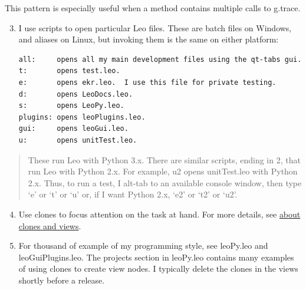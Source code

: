 \documentclass[a4paper,10pt,english]{sphinxmanual}
\begin{document}
This pattern is especially useful when a method contains multiple calls to
g.trace.
\begin{enumerate}
\setcounter{enumi}{2}
\item {} 
I use scripts to open particular Leo files. These are batch files on Windows,
and aliases on Linux, but invoking them is the same on either platform:

\begin{Verbatim}[commandchars=\\\{\}]
all:     opens all my main development files using the qt-tabs gui.
t:       opens test.leo.
e:       opens ekr.leo.  I use this file for private testing.
d:       opens LeoDocs.leo.
s:       opens LeoPy.leo.
plugins: opens leoPlugins.leo.
gui:     opens leoGui.leo.
u:       opens unitTest.leo.
\end{Verbatim}

\end{enumerate}
\begin{quote}

These run Leo with Python 3.x. There are similar scripts, ending in 2, that run
Leo with Python 2.x. For example, u2 opens unitTest.leo with Python 2.x.
Thus, to run a test, I alt-tab to an available console window, then type `e' or
`t' or `u' or, if I want Python 2.x, `e2' or `t2' or `u2'.
\end{quote}
\begin{enumerate}
\setcounter{enumi}{3}
\item {} 
Use clones to focus attention on the task at hand.
For more details, see \href{http://webpages.charter.net/edreamleo/intro.html\#clones-views}{about clones and views}.

\item {} 
For thousand of example of my programming style, see leoPy.leo and
leoGuiPlugins.leo. The projects section in leoPy.leo contains many examples
of using clones to create view nodes. I typically delete the clones in the
views shortly before a release.

\end{enumerate}
\end{document}
